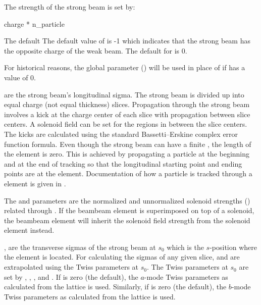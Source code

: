 The strength of the strong beam is set by:
\begin{example}
  charge * n_particle
\end{example}
The default The default value of  is -1 which indicates that the strong beam has the
opposite charge of the weak beam. The default for  is 0.

For historical reasons, the global parameter  () will be used in
place of  if  has a value of 0.

 are the strong beam's longitudinal sigma.  The strong beam is divided up into
 equal charge (not equal thickness) slices. Propagation through the strong beam involves
a kick at the charge center of each slice with propagation between slice centers. A solenoid field
can be set for the regions in between the slice centers. The kicks are calculated using the standard
Bassetti--Erskine complex error function formula\cite{b:talman}. Even though the strong beam can
have a finite , the length of the  element is zero. This is achieved by
propagating a particle at the beginning and at the end of tracking so that the longitudinal starting
point and ending points are at the  element. Documentation of how a particle is tracked
through a  element is given in .

The  and  parameters are the normalized and unnormalized solenoid strengths
() related through . If the beambeam element is superimposed on top
of a solenoid, the beambeam element will inherit the solenoid field strength from the solenoid
element instead.

,  are the transverse sigmas of the strong beam at $s_0$ which is the
$s$-position where the  element is located.  For calculating the sigmas of any given
slice,  and  are extrapolated using the Twiss parameters at $s_0$. The Twiss
parameters at $s_0$ are set by , , , and
.  If  is zero (the default), the $a$-mode Twiss parameters as
calculated from the lattice is used. Similarly, if  is zero (the default), the
$b$-mode Twiss parameters as calculated from the lattice is used.

